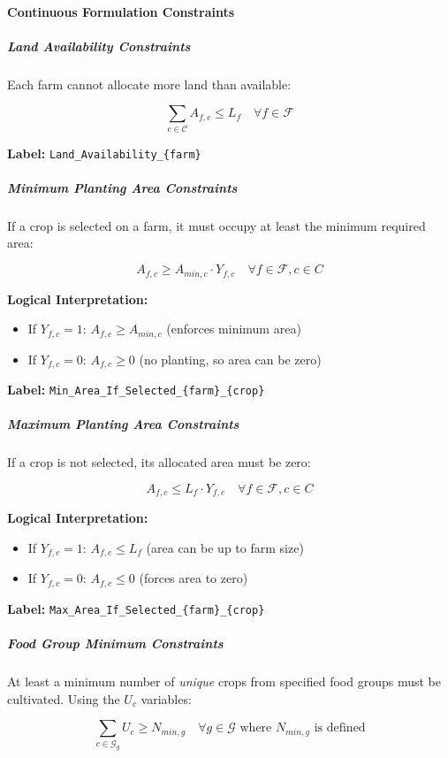 \documentclass{oqireport}
\begin{document}
\paragraph{Continuous Formulation Constraints}

\subparagraph{Land Availability Constraints}

Each farm cannot allocate more land than available:

$$\sum_{c \in \mathcal{C}} A_{f,c} \leq L_f \quad \forall f \in \mathcal{F}$$

\textbf{Label:} \texttt{Land\_Availability\_\{farm\}}

\subparagraph{Minimum Planting Area Constraints}

If a crop is selected on a farm, it must occupy at least the minimum required area:

$$A_{f,c} \geq A_{min,c} \cdot Y_{f,c} \quad \forall f \in \mathcal{F}, c \in C$$


\textbf{Logical Interpretation:}
\begin{itemize}
    \item If $Y_{f,c} = 1$: $A_{f,c} \geq A_{min,c}$ (enforces minimum area)
    \item If $Y_{f,c} = 0$: $A_{f,c} \geq 0$ (no planting, so area can be zero)
\end{itemize}

\textbf{Label:} \texttt{Min\_Area\_If\_Selected\_\{farm\}\_\{crop\}}

\subparagraph{Maximum Planting Area Constraints}

If a crop is not selected, its allocated area must be zero:

$$A_{f,c} \leq L_f \cdot Y_{f,c} \quad \forall f \in \mathcal{F}, c \in C$$


\textbf{Logical Interpretation:}
\begin{itemize}
    \item If $Y_{f,c} = 1$: $A_{f,c} \leq L_f$ (area can be up to farm size)
    \item If $Y_{f,c} = 0$: $A_{f,c} \leq 0$ (forces area to zero)
\end{itemize}

\textbf{Label:} \texttt{Max\_Area\_If\_Selected\_\{farm\}\_\{crop\}}

\subparagraph{Food Group Minimum Constraints}

At least a minimum number of \textit{unique} crops from specified food groups must be cultivated. Using the $U_c$ variables:

$$\sum_{c \in \mathcal{G}_g} U_c \geq N_{min,g} \quad \forall g \in \mathcal{G} \text{ where } N_{min,g} \text{ is defined}$$
\end{document}
